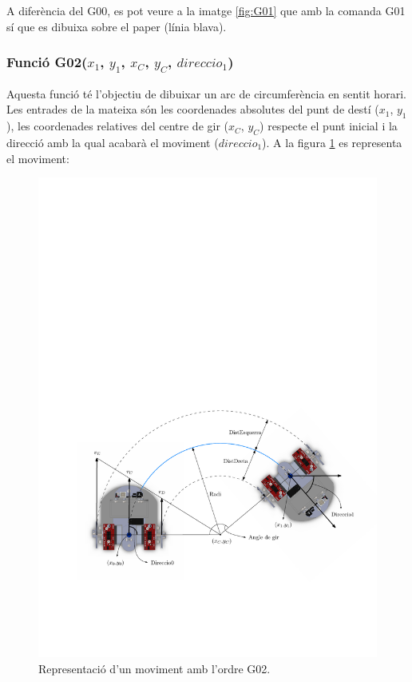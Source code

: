 A diferència del G00, es pot veure a la imatge \ref{fig:G01} que amb la comanda G01 sí que es dibuixa sobre el paper (línia blava).

\subsubsection{Funció G02($x_{1}$, $y_{1}$, $x_{C}$, $y_{C}$, $direccio_{1}$)}\label{funG02}

Aquesta funció té l’objectiu de dibuixar un arc de circumferència en sentit horari. Les entrades de la mateixa són les coordenades absolutes del punt de destí ($x_{1}$, $y_{1}$), les coordenades relatives del centre de gir ($x_{C}$, $y_{C}$) respecte el punt inicial i la direcció amb la qual acabarà el moviment ($direccio_{1}$). A la figura \ref{fig:G02} es representa el moviment:

\begin{figure}[H]
	\centering
	\includegraphics[scale=0.9]{G02}
	\caption{Representació d'un moviment amb l'ordre G02.}
	\label{fig:G02}
\end{figure}

